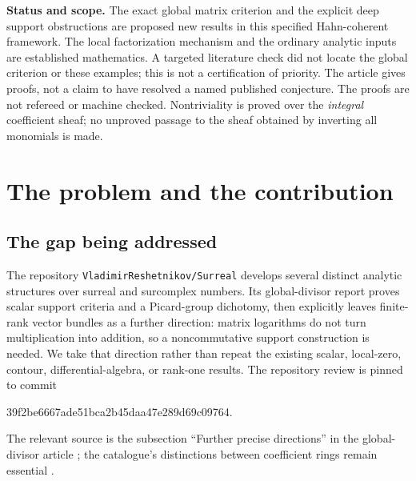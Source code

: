 \documentclass[11pt,letterpaper]{article}
\theoremstyle{definition}
\theoremstyle{remark}
\numberwithin{equation}{section}
\begin{document}
\begin{titlepage}
\begin{minipage}{0.94\textwidth}
\begin{abstract}
We also prove support-controlled rigidity for positive matrix cocycles on Stein manifolds, and for positive deformations of ordinary holomorphic vector bundles. On Stein bases, every positive cocycle over a cyclic value group splits; noncyclic groups admit determinant-one counterexamples already in rank two. All infinite constructions use well-ordered supports and finite coefficient multiplicity, not fine-topological convergence.
\end{abstract}
\end{minipage}
\vfill
\begin{minipage}{0.94\textwidth}\small
\textbf{Status and scope.} The exact global matrix criterion and the explicit deep support obstructions are proposed new results in this specified Hahn-coherent framework. The local factorization mechanism and the ordinary analytic inputs are established mathematics. A targeted literature check did not locate the global criterion or these examples; this is not a certification of priority. The article gives proofs, not a claim to have resolved a named published conjecture. The proofs are not refereed or machine checked. Nontriviality is proved over the \emph{integral} coefficient sheaf; no unproved passage to the sheaf obtained by inverting all monomials is made.
\end{minipage}
\end{titlepage}
\hypersetup{pageanchor=true}
\tableofcontents
\newpage
{}

\section{The problem and the contribution}\label{sec:introduction}

\subsection{The gap being addressed}

The repository \texttt{VladimirReshetnikov/Surreal} develops several distinct analytic structures over surreal and surcomplex numbers. Its global-divisor report proves scalar support criteria and a Picard-group dichotomy, then explicitly leaves finite-rank vector bundles as a further direction: matrix logarithms do not turn multiplication into addition, so a noncommutative support construction is needed. We take that direction rather than repeat the existing scalar, local-zero, contour, differential-algebra, or rank-one results. The repository review is pinned to commit
\begin{center}\small\ttfamily
39f2be6667ade51bca2b45daa47e289d69c09764.
\end{center}
The relevant source is the subsection ``Further precise directions'' in the global-divisor article \cite{RepoGlobal}; the catalogue's distinctions between coefficient rings remain essential \cite{RepoMap}.
\end{document}
